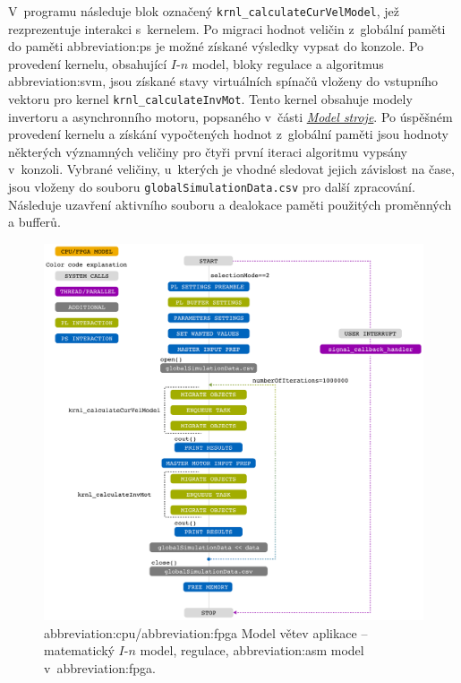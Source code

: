 \documentclass[a4paper, twoside, 11pt]{article}
\begin{document}
			V~programu následuje blok označený \texttt{krnl\_calculateCurVelModel}, jež rezprezentuje interakci s~kernelem. Po migraci hodnot veličin z~globální paměti do paměti \gls{abbreviation:ps} je možné získané výsledky vypsat do konzole. Po provedení kernelu, obsahující $I$-$n$ model, bloky regulace a algoritmus \gls{abbreviation:svm}, jsou získané stavy virtuálních spínačů vloženy do vstupního vektoru pro kernel \texttt{krnl\_calculateInvMot}. Tento kernel obsahuje modely invertoru a asynchronního motoru, popsaného v~části \hyperref[sec:model-stroje]{\textit{Model stroje}}. Po úspěšném provedení kernelu a získání vypočtených hodnot z~globální paměti jsou hodnoty některých významných veličiny pro čtyři první iteraci algoritmu vypsány v~konzoli. Vybrané veličiny, u~kterých je vhodné sledovat jejich závislost na čase, jsou vloženy do souboru \texttt{globalSimulationData.csv} pro další zpracování. Následuje uzavření aktivního souboru a dealokace paměti použitých proměnných a bufferů.

			\begin{figure}[htbp!]
				\centering
				\includegraphics[width=1\textwidth]{src/pdf/cpu-fpga-model.pdf}
				\caption{\gls{abbreviation:cpu}/\gls{abbreviation:fpga} Model větev aplikace – matematický $I$-$n$ model, regulace, \gls{abbreviation:asm} model v~\gls{abbreviation:fpga}.}
				\label{fig:cpu-fpga-model}
			\end{figure}	 
\end{document}

